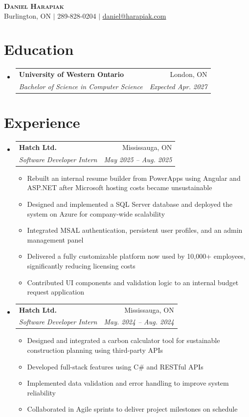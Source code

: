 \documentclass[letterpaper,10pt]{article}
\makeatletter
\newcommand{\resumeItem}[1]{\item\small{#1 \vspace{-2pt}}}
\newcommand{\resumeSubheading}[4]{
  \vspace{-2pt}\item
  \begin{tabular*}{0.97\textwidth}[t]{l@{\extracolsep{\fill}}r}
    \textbf{#1} & #2 \\
    \textit{\small#3} & \textit{\small #4} \\
  \end{tabular*}\vspace{-6pt}
}
\newcommand{\resumeSubHeadingListStart}{\begin{itemize}[leftmargin=0.15in, label={}]}
\newcommand{\resumeSubHeadingListEnd}{\end{itemize}}
\newcommand{\resumeItemListStart}{\begin{itemize}[itemsep=0pt]}
\newcommand{\resumeItemListEnd}{\end{itemize}\vspace{-4pt}}
\makeatother
\begin{document}
\begin{center}
  \textbf{\Huge \scshape Daniel Harapiak} \\ \vspace{1pt}
  \small Burlington, ON $|$ 289-828-0204 $|$
  \href{mailto:daniel@harapiak.com}{\underline{daniel@harapiak.com}}
\end{center}

\section{Education}
\resumeSubHeadingListStart
  \resumeSubheading
    {University of Western Ontario}{London, ON}
    {Bachelor of Science in Computer Science}{Expected Apr. 2027}
\resumeSubHeadingListEnd


\section{Experience}
\resumeSubHeadingListStart

\resumeSubheading
  {Hatch Ltd.}{Mississauga, ON}
  {Software Developer Intern}{May 2025 -- Aug. 2025}
\resumeItemListStart
  \resumeItem{Rebuilt an internal resume builder from PowerApps using Angular and ASP.NET after Microsoft hosting costs became unsustainable}
  \resumeItem{Designed and implemented a SQL Server database and deployed the system on Azure for company-wide scalability}
  \resumeItem{Integrated MSAL authentication, persistent user profiles, and an admin management panel}
  \resumeItem{Delivered a fully customizable platform now used by 10{,}000+ employees, significantly reducing licensing costs}
  \resumeItem{Contributed UI components and validation logic to an internal budget request application}
\resumeItemListEnd

\resumeSubheading
  {Hatch Ltd.}{Mississauga, ON}
  {Software Developer Intern}{May. 2024 -- Aug. 2024}
\resumeItemListStart
  \resumeItem{Designed and integrated a carbon calculator tool for sustainable construction planning using third-party APIs}
  \resumeItem{Developed full-stack features using C\# and RESTful APIs}
  \resumeItem{Implemented data validation and error handling to improve system reliability}
  \resumeItem{Collaborated in Agile sprints to deliver project milestones on schedule}
\resumeItemListEnd

\resumeSubHeadingListEnd
\end{document}
